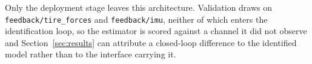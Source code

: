 Only the deployment stage leaves this architecture. Validation draws on
\texttt{feedback/\allowbreak tire\_forces} and \texttt{feedback/imu}, neither of
which enters the identification loop, so the estimator is scored against a
channel it did not observe and Section~\ref{sec:results} can attribute a
closed-loop difference to the identified model rather than to the interface
carrying it.
